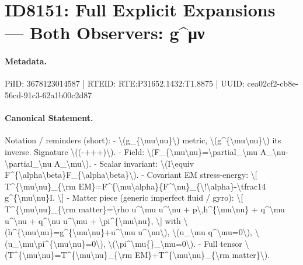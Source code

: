\section*{ID8151: Full Explicit Expansions — Both Observers: g\textasciicircum{}μν}
\paragraph{Metadata.}
PiID: 3678123014587 | RTEID: RTE:P31652.1432:T1.8875 | UUID: cea02cf2-cb8e-56cd-91c3-62a1b00c2d87

\paragraph{Canonical Statement.}
Notation / reminders (short): - \textbackslash{}(g\_\{\textbackslash{}mu\textbackslash{}nu\}\textbackslash{}) metric, \textbackslash{}(g\textasciicircum{}\{\textbackslash{}mu\textbackslash{}nu\}\textbackslash{}) its inverse. Signature \textbackslash{}((-+++)\textbackslash{}). - Field: \textbackslash{}(F\_\{\textbackslash{}mu\textbackslash{}nu\}=\textbackslash{}partial\_\textbackslash{}mu A\_\textbackslash{}nu-\textbackslash{}partial\_\textbackslash{}nu A\_\textbackslash{}mu\textbackslash{}). - Scalar invariant: \textbackslash{}(I\textbackslash{}equiv F\textasciicircum{}\{\textbackslash{}alpha\textbackslash{}beta\}F\_\{\textbackslash{}alpha\textbackslash{}beta\}\textbackslash{}). - Covariant EM stress-energy: \textbackslash{}[ T\textasciicircum{}\{\textbackslash{}mu\textbackslash{}nu\}\_\{\textbackslash{}rm EM\}=F\textasciicircum{}\{\textbackslash{}mu\textbackslash{}alpha\}\{F\textasciicircum{}\textbackslash{}nu\}\_\{\textbackslash{}!\textbackslash{}alpha\}-\textbackslash{}tfrac14 g\textasciicircum{}\{\textbackslash{}mu\textbackslash{}nu\}I. \textbackslash{}] - Matter piece (generic imperfect fluid / gyro): \textbackslash{}[ T\textasciicircum{}\{\textbackslash{}mu\textbackslash{}nu\}\_\{\textbackslash{}rm matter\}=\textbackslash{}rho u\textasciicircum{}\textbackslash{}mu u\textasciicircum{}\textbackslash{}nu + p\textbackslash{},h\textasciicircum{}\{\textbackslash{}mu\textbackslash{}nu\} + q\textasciicircum{}\textbackslash{}mu u\textasciicircum{}\textbackslash{}nu + q\textasciicircum{}\textbackslash{}nu u\textasciicircum{}\textbackslash{}mu + \textbackslash{}pi\textasciicircum{}\{\textbackslash{}mu\textbackslash{}nu\}, \textbackslash{}] with \textbackslash{}(h\textasciicircum{}\{\textbackslash{}mu\textbackslash{}nu\}=g\textasciicircum{}\{\textbackslash{}mu\textbackslash{}nu\}+u\textasciicircum{}\textbackslash{}mu u\textasciicircum{}\textbackslash{}nu\textbackslash{}), \textbackslash{}(u\_\textbackslash{}mu q\textasciicircum{}\textbackslash{}mu=0\textbackslash{}), \textbackslash{}(u\_\textbackslash{}mu\textbackslash{}pi\textasciicircum{}\{\textbackslash{}mu\textbackslash{}nu\}=0\textbackslash{}), \textbackslash{}(\textbackslash{}pi\textasciicircum{}\textbackslash{}mu\{\}\_\textbackslash{}mu=0\textbackslash{}). - Full tensor \textbackslash{}(T\textasciicircum{}\{\textbackslash{}mu\textbackslash{}nu\}=T\textasciicircum{}\{\textbackslash{}mu\textbackslash{}nu\}\_\{\textbackslash{}rm EM\}+T\textasciicircum{}\{\textbackslash{}mu\textbackslash{}nu\}\_\{\textbackslash{}rm matter\}\textbackslash{}).

